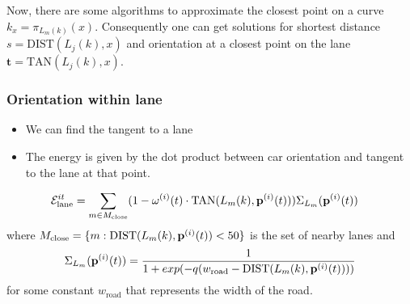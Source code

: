\documentclass[10pt,twocolumn,letterpaper]{article}
\begin{document}
\newcommand{\projOnLane}[1]{\pi_{L_m(k)}(#1)}
Now, there are some algorithms \cite{ma2003point, chen2007improved} to
approximate the closest point on a \Beizer curve $k_x = \projOnLane{x}$.
Consequently one can get solutions for shortest distance $s =
\text{DIST}(L_j(k), x)$ and orientation at a closest point on the lane
$\mathbf{t} = \text{TAN}(L_j(k), x)$.

%
%



\subsubsection{Orientation within lane}
\begin{itemize}
  \item We can find the tangent to a lane
  \item The energy is given by the dot product between car orientation
    and tangent to the lane at that point.
\end{itemize}

% 
% 
% 

%   

\begin{align}
  \label{eq:laneOrientationEnergy}
  \mathcal{E}^{it}_{\text{lane}} &= 
  \sum_{m \in M_{\text{close}}}
  (1 - \mathbf{\omega}^{(i)}(t) \cdot \text{TAN}(L_{m}(k), \mathbf{p}^{(i)}(t)) )
\Sigma_{L_m}(\mathbf{p}^{(i)}(t))
\end{align}
where $M_{\text{close}} = \{m : \text{DIST}(L_{m}(k), \mathbf{p}^{(i)}(t)) < 50\} $ is
the set of nearby lanes and 
\begin{align}
\Sigma_{L_m}(\mathbf{p}^{(i)}(t)) = 
  \frac{1}{1 + exp(-q(w_{\text{road}} - \text{DIST}(L_{m}(k), \mathbf{p}^{(i)}(t))))}
\end{align}
for some constant $w_{\text{road}}$ that represents the width of the road.
\end{document}
